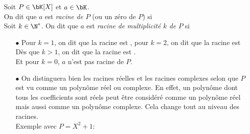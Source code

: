 \documentclass[a4paper, 11pt,reqno]{article}
\begin{document}
\begin{defi}
	Soit $P\in\bK[X]$ et $a\in\bK$. \\
	On dit que $a$ est \emph{racine de $P$} (ou un zéro de $P$) si  $$ $$
	Soit $k\in \N^*$. On dit que $a$ est\emph{ racine de multiplicité $k$  de  $P$} si  $$ $$\vspace{1cm}
\end{defi}




\begin{rems}
	\begin{itemize}
		\noindent Ainsi, d\`es que l'on conna\^it une racine (ou z\'ero) $a$ de $P$, on peut factorier $P$ par $X-a$.
		\item[$\bullet$] Pour $k=1$, on dit que la racine est \dotfill, pour $k=2$, on dit que la racine est \dotfill\\
		      \noindent D\`es que $k>1$, on dit que la racine est \dotfill. \\
		      Et pour $k=0$, $a$ n'est pas racine de $P$.
		\item[$\bullet$]  \noindent \warning  On distinguera bien les racines r\'eelles et les racines complexes selon que $P$ est vu comme un polyn\^ome r\'eel ou complexe. En effet, un polyn\^ome dont tous les coefficients sont r\'eels peut \^etre consid\'er\'e comme un polyn\^ome r\'eel mais aussi comme un polyn\^ome complexe. Cela change tout au niveau des racines.\\
		      \noindent  Exemple avec $P=X^2+1$:

	\end{itemize}
\end{rems}
\end{document}
